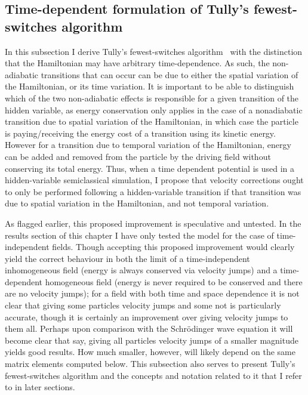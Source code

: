 \subsection{Time-dependent formulation of Tully's fewest-switches algorithm}\label{sec:fewest_switches}

In this subsection I derive Tully's fewest-switches algorithm~\cite{doi:10.1146/annurev-physchem-040215-112245, doi:10.1063/1.459170} with the distinction that the Hamiltonian may have arbitrary time-dependence. As such, the non-adiabatic transitions that can occur can be due to either the spatial variation of the Hamiltonian, or its time variation. It is important to be able to distinguish which of the two non-adiabatic effects is responsible for a given transition of the hidden variable, as energy conservation only applies in the case of a nonadiabatic transition due to spatial variation of the Hamiltonian, in which case the particle is paying/receiving the energy cost of a transition using its kinetic energy. However for a transition due to temporal variation of the Hamiltonian, energy can be added and removed from the particle by the driving field without conserving its total energy. Thus, when a time dependent potential is used in a hidden-variable semiclassical simulation, I propose that velocity corrections ought to only be performed following a hidden-variable transition if that transition was due to spatial variation in the Hamiltonian, and not temporal variation.

As flagged earlier, this proposed improvement is speculative and untested. In the results section of this chapter I have only tested the model for the case of time-independent fields. Though accepting this proposed improvement would clearly yield the correct behaviour in both the limit of a time-independent inhomogeneous field (energy is always conserved via velocity jumps) and a time-dependent homogeneous field (energy is never required to be conserved and there are no velocity jumps); for a field with both time and space dependence it is not clear that giving some particles velocity jumps and some not is particularly accurate, though it is certainly an improvement over giving velocity jumps to them all. Perhaps upon comparison with the Schr\"odinger wave equation it will become clear that say, giving all particles velocity jumps of a smaller magnitude yields good results. How much smaller, however, will likely depend on the same matrix elements computed below. This subsection also serves to present Tully's fewest-switches algorithm and the concepts and notation related to it that I refer to in later sections.

